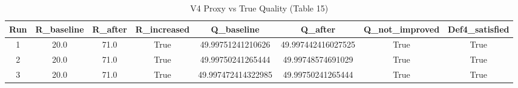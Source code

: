\begin{table}[htbp]
\centering
\caption{V4 Proxy vs True Quality (Table 15)}
\begin{tabular}{cccccccc}
\toprule
Run & R_baseline & R_after & R_increased & Q_baseline & Q_after & Q_not_improved & Def4_satisfied \\
\midrule
1 & 20.0 & 71.0 & True & 49.99751241210626 & 49.997442416027525 & True & True \\
2 & 20.0 & 71.0 & True & 49.99750241265444 & 49.99748574691029 & True & True \\
3 & 20.0 & 71.0 & True & 49.997472414322985 & 49.99750241265444 & True & True \\
\bottomrule
\end{tabular}
\end{table}

